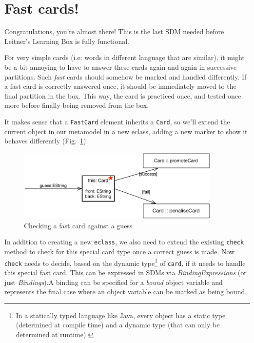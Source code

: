 \newpage
\section{Fast cards!}
\genHeader
\hypertarget{sec:fastCard}{}

Congratulations, you're almost there! This is the last SDM needed before Leitner's Learning Box is fully functional.

For very simple cards (i.e: words in different language that are similar), it might be a bit annoying to have to answer these cards again and again in
successive partitions. Such \emph{fast} cards should somehow be marked and handled differently. If a fast card is correctly answered once, it should be
immediately moved to the final partition in the box. This way, the card is practiced once, and tested once more before finally being removed from the
box.

It makes sense that a \texttt{FastCard} element inherits a \texttt{Card}, so we'll extend the current object in our metamodel in a new eclass, adding a
new marker to show it behaves differently (Fig.~\ref{fig:goal_fastCard}).

\begin{figure}[htbp]
	\centering
    \includegraphics[width=0.9\textwidth]{goal_fastCard}
	\caption{Checking a fast card against a guess}
	\label{fig:goal_fastCard}
\end{figure}
\FloatBarrier

In addition to creating a new \texttt{eclass}, we also need to extend the existing \texttt{check} method to check for this special card type once a correct
guess is made. Now \texttt{check} needs to decide, based on the dynamic type\footnote{In a statically typed language like Java, every object has a static type
(determined at compile time) and a dynamic type (that can only be determined at runtime).} of \texttt{card}, if it needs to handle this special fast card. This
can be expressed in SDMs via \emph{BindingExpressions} (or just \emph{Bindings}).A binding can be specified for a \emph{bound} object variable
and represents the final case where an object variable can be marked as being bound.

